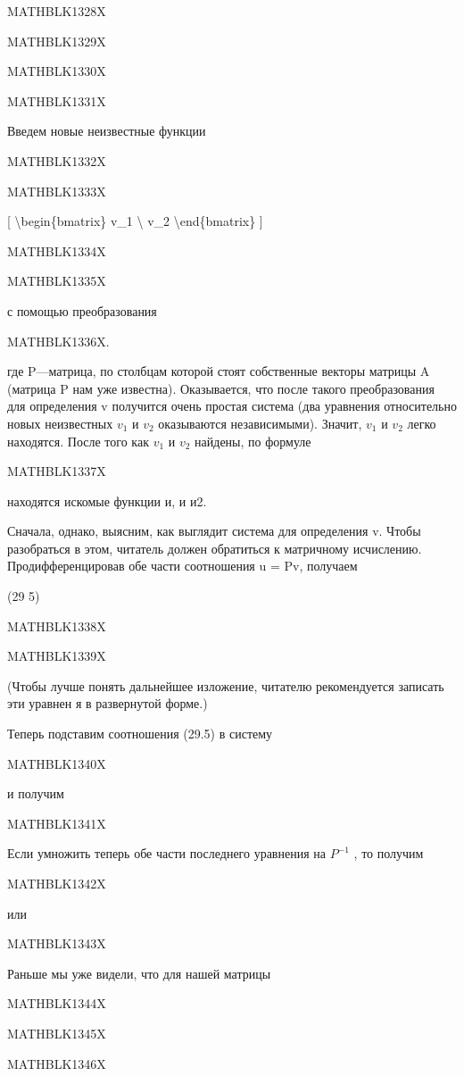 \documentclass[
]{article}
\begin{document}
MATHBLK1328X

MATHBLK1329X

MATHBLK1330X

MATHBLK1331X

Введем новые неизвестные функции

MATHBLK1332X

MATHBLK1333X

{[} \textbackslash begin\{bmatrix\} v\_1 \textbackslash{} v\_2
\textbackslash end\{bmatrix\} {]}

MATHBLK1334X

MATHBLK1335X

с помощью преобразования

MATHBLK1336X.

где P---матрица, по столбцам которой стоят собственные векторы матрицы A
(матрица P нам уже известна). Оказывается, что после такого
преобразования для определения v получится очень простая система (два
уравнения относительно новых неизвестных \(v_1\) и \(v_2\) оказываются
независимыми). Значит, \(v_1\) и \(v_2\) легко находятся. После того как
\(v_1\) и \(v_2\) найдены, по формуле

MATHBLK1337X

находятся искомые функции и, и и2.

Сначала, однако, выясним, как выглядит система для определения v. Чтобы
разобраться в этом, читатель должен обратиться к матричному исчислению.
Продифференцировав обе части соотношения u = Pv, получаем

(29 5)

MATHBLK1338X

MATHBLK1339X

(Чтобы лучше понять дальнейшее изложение, читателю рекомендуется
записать эти уравнен я в развернутой форме.)

Теперь подставим соотношения (29.5) в систему

MATHBLK1340X

и получим

MATHBLK1341X

Если умножить теперь обе части последнего уравнения на \(P^{-1}\) , то
получим

MATHBLK1342X

или

MATHBLK1343X

Раньше мы уже видели, что для нашей матрицы

MATHBLK1344X

MATHBLK1345X

MATHBLK1346X
\end{document}
